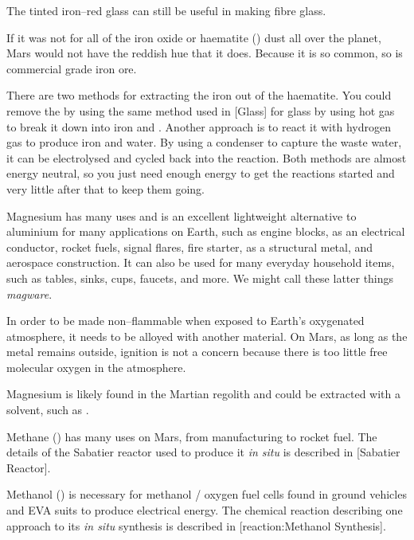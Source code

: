 The tinted iron--red glass can still be useful in making fibre glass.

If it was not for all of the iron oxide or haematite () dust all over the planet, Mars would not have the reddish hue that it does. Because it is so common, so is commercial grade iron ore. 

There are two methods for extracting the iron out of the haematite. You could remove the  by using the same method used in [Glass] for glass by using hot  gas to break it down into iron and . Another approach is to react it with hydrogen gas to produce iron and water. By using a condenser to capture the waste water, it can be electrolysed and cycled back into the reaction. Both methods are almost energy neutral, so you just need enough energy to get the reactions started and very little after that to keep them going.

Magnesium has many uses and is an excellent lightweight alternative to aluminium for many applications on Earth, such as engine blocks, as an electrical conductor, rocket fuels, signal flares, fire starter, as a structural metal, and aerospace construction. It can also be used for many everyday household items, such as tables, sinks, cups, faucets, and more. We might call these latter things {\it magware}.

In order to be made non--flammable when exposed to Earth's oxygenated atmosphere, it needs to be alloyed with another material. On Mars, as long as the metal remains outside, ignition is not a concern because there is too little free molecular oxygen in the atmosphere.

Magnesium is likely found in the Martian regolith and could be extracted with a solvent, such as .

Methane () has many uses on Mars, from manufacturing to rocket fuel. The details of the Sabatier reactor used to produce it {\it in situ} is described in [Sabatier Reactor].

Methanol () is necessary for methanol / oxygen fuel cells found in ground vehicles and EVA suits to produce electrical energy. The chemical reaction describing one approach to its {\it in situ} synthesis is described in [reaction:Methanol Synthesis].

\startformula
{}
\stopformula

